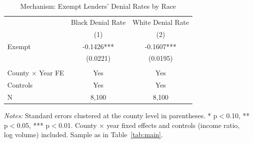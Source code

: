 \begin{table}[H]
\centering
\caption{Mechanism: Exempt Lenders' Denial Rates by Race}
\label{tab:mechanism}
\begin{threeparttable}
\begin{tabular}{lcc}
\toprule
& Black Denial Rate & White Denial Rate \\
& (1) & (2) \\
\midrule
Exempt & -0.1426*** & -0.1607*** \\
& (0.0221) & (0.0195) \\
\\
County $\times$ Year FE & Yes & Yes \\
Controls & Yes & Yes \\
\midrule
N & 8,100 & 8,100 \\
\bottomrule
\end{tabular}
\begin{tablenotes}[flushleft]\small
\item \textit{Notes:} Standard errors clustered at the county level in parentheses. * p$<$0.10, ** p$<$0.05, *** p$<$0.01. County $\times$ year fixed effects and controls (income ratio, log volume) included. Sample as in Table~\ref{tab:main}.
\end{tablenotes}
\end{threeparttable}
\end{table}
